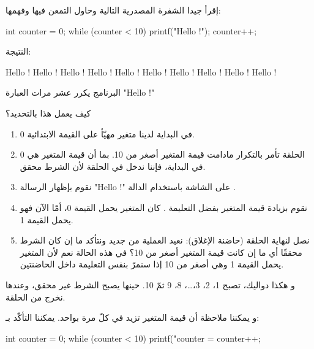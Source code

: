 إقرأ جيدا الشفرة المصدرية التالية وحاول التمعن فيها وفهمها:

\begin{Csource}
int counter = 0;
while (counter < 10)
{
	printf("Hello !\n");
	counter++;
}
\end{Csource}

النتيجة:

\begin{Console}
Hello !
Hello !
Hello !
Hello !
Hello !
Hello !
Hello !
Hello !
Hello !
Hello !
\end{Console}

البرنامج يكرر عشر مرات العبارة
"\textenglish{Hello !}"

\begin{question}
كيف يعمل هذا بالتحديد؟
\end{question}

\begin{enumerate}
	\item في البداية لدينا متغير 
	مهيّأ على القيمة الابتدائية 0.
	\item الحلقة 
تأمر بالتكرار مادامت قيمة المتغير
أصغر من 10. بما أن قيمة المتغير 
هي 0 في البداية، فإننا ندخل في الحلقة لأن الشرط محقق.
	\item نقوم بإظهار الرسالة 
	"\textenglish{Hello !}"
على الشاشة باستخدام الدالة 
.
	\item نقوم بزيادة قيمة المتغير 
بفضل التعليمة 
	.
كان المتغير
يحمل القيمة 0، أمّا الآن فهو يحمل القيمة 1.
	\item نصل لنهاية الحلقة (حاضنة الإغلاق): نعيد العملية من جديد ونتأكد ما إن كان الشرط محققًا أي ما إن كانت قيمة المتغير أصغر من 10؟ في هذه الحالة نعم لأن المتغير
	يحمل القيمة 1 وهي أصغر من 10 إذا سنمرّ بنفس التعليمة داخل الحاضنتين.
\end{enumerate}

و هكذا دواليك،
تصبح 1، 2، 3،\dots، 8، 9 ثمّ 10. حينها يصبح الشرط 
غير محقق، وعندها نخرج من الحلقة.

و يمكننا ملاحظة أن قيمة المتغير
 تزيد في كلّ مرة بواحد. يمكننا التأكّد بـ:

\begin{Csource}
int counter = 0;
while (counter < 10)
{
	printf("counter = %
	counter++;
}
\end{Csource}

